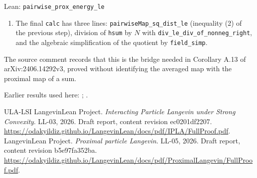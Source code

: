 \documentclass[11pt,a4paper]{article}
\begin{document}
\begin{leanbox}{Lean: \texttt{pairwise\_\allowbreak{}prox\_\allowbreak{}energy\_\allowbreak{}le}}
\begin{enumerate}
\item The final \texttt{calc} has three lines: \texttt{pairwise\allowbreak{}Map\_\allowbreak{}sq\_\allowbreak{}dist\_\allowbreak{}le} (inequality (2) of the previous step), division of \texttt{hsum} by \(N\) with \texttt{div\_\allowbreak{}le\_\allowbreak{}div\_\allowbreak{}of\_\allowbreak{}nonneg\_\allowbreak{}right}, and the algebraic simplification of the quotient by \texttt{field\_\allowbreak{}simp}.

\end{enumerate}



The source comment records that this is the bridge needed in Corollary A.13 of arXiv:2406.14292v3, proved without identifying the averaged map with the proximal map of a sum.
\end{leanbox}


Earlier results used here: \cite[Section~3.1.1]{LangevinLean2026IPLA}; \cite[Section~3.1.2]{LangevinLean2026IPLA}.

\begin{thebibliography}{ULA-LSI}
LangevinLean Project. \emph{Interacting Particle Langevin under Strong Convexity}. LL-03, 2026. Draft report, content revision ec0201df2207. \url{https://odakyildiz.github.io/LangevinLean/docs/pdf/IPLA/FullProof.pdf}.
LangevinLean Project. \emph{Proximal particle Langevin}. LL-05, 2026. Draft report, content revision b5e97fa352ba. \url{https://odakyildiz.github.io/LangevinLean/docs/pdf/ProximalLangevin/FullProof.pdf}.
\end{thebibliography}
\end{document}
